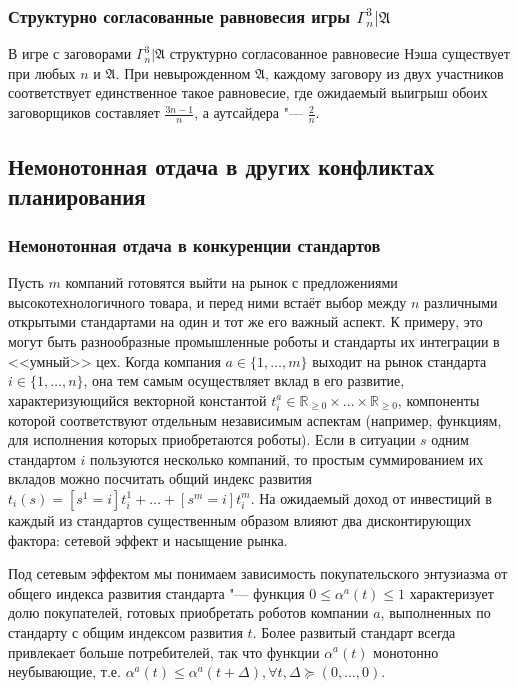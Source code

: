 \begin{frame}
	\frametitle{Структурно согласованные равновесия игры $\Gamma^3_n | \mathfrak{A}$}
	В игре с заговорами $\Gamma^3_n | \mathfrak{A}$ структурно согласованное равновесие Нэша существует при любых $n$ и $\mathfrak{A}$. При невырожденном $\mathfrak{A}$, каждому заговору из двух участников соответствует единственное такое равновесие, где ожидаемый выигрыш обоих заговорщиков составляет $\frac{3 n - 1}{n}$, а аутсайдера "--- $\frac{2}{n}$.
\end{frame}

\subsection{Немонотонная отдача в других конфликтах планирования}

\begin{frame}[allowframebreaks]
	\frametitle{Немонотонная отдача в конкуренции стандартов}
	Пусть $m$ компаний готовятся выйти на рынок с предложениями высокотехнологичного товара, и перед ними встаёт выбор между $n$ различными открытыми стандартами на один и тот же его важный аспект. К примеру, это могут быть разнообразные промышленные роботы и стандарты их интеграции в <<умный>> цех. Когда компания $a \in \{1, \ldots, m\}$ выходит на рынок стандарта $i \in \{1, \ldots, n\}$, она тем самым осуществляет вклад в его развитие, характеризующийся векторной константой $t_i^a \in \mathbb{R}_{\ge 0} \times \ldots \times \mathbb{R}_{\ge 0}$, компоненты которой соответствуют отдельным независимым аспектам (например, функциям, для исполнения которых приобретаются роботы). Если в ситуации $s$ одним стандартом $i$ пользуются несколько компаний, то простым суммированием их вкладов можно посчитать общий индекс развития $t_i(s) = [s^1 = i] t_i^1 + \ldots + [s^m = i] t_i^m$. На ожидаемый доход от инвестиций в каждый из стандартов существенным образом влияют два дисконтирующих фактора: сетевой эффект и насыщение рынка.
	
	\framebreak
	
	Под сетевым эффектом мы понимаем зависимость покупательского энтузиазма от общего индекса развития стандарта "--- функция $0 \le \alpha^a(t) \le 1$ характеризует долю покупателей, готовых приобретать роботов компании $a$, выполненных по стандарту с общим индексом развития $t$. Более развитый стандарт всегда привлекает больше потребителей, так что функции $\alpha^a(t)$ монотонно неубывающие, т.е. $\alpha^a(t) \le \alpha^a(t + \Delta), \forall t, \Delta \succeq (0, \ldots, 0)$.
	

\end{frame}
